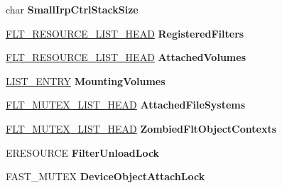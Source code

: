 \begin{DoxyCompactItemize}
\item 
\mbox{\label{struct___f_l_t_p___f_r_a_m_e_a39fcca68c78d7ef3ea8e784ebdffc093}} 
char {\bfseries Small\+Irp\+Ctrl\+Stack\+Size}
\item 
\mbox{\label{struct___f_l_t_p___f_r_a_m_e_a5c351985b1e09723dd4bb00469c73f6c}} 
\hyperlink{struct___f_l_t___r_e_s_o_u_r_c_e___l_i_s_t___h_e_a_d}{F\+L\+T\+\_\+\+R\+E\+S\+O\+U\+R\+C\+E\+\_\+\+L\+I\+S\+T\+\_\+\+H\+E\+AD} {\bfseries Registered\+Filters}
\item 
\mbox{\label{struct___f_l_t_p___f_r_a_m_e_a8d774b90231d3619939212f4afb43809}} 
\hyperlink{struct___f_l_t___r_e_s_o_u_r_c_e___l_i_s_t___h_e_a_d}{F\+L\+T\+\_\+\+R\+E\+S\+O\+U\+R\+C\+E\+\_\+\+L\+I\+S\+T\+\_\+\+H\+E\+AD} {\bfseries Attached\+Volumes}
\item 
\mbox{\label{struct___f_l_t_p___f_r_a_m_e_adeff92772c1d1d1850ebf94737a4cd03}} 
\hyperlink{struct___l_i_s_t___e_n_t_r_y}{L\+I\+S\+T\+\_\+\+E\+N\+T\+RY} {\bfseries Mounting\+Volumes}
\item 
\mbox{\label{struct___f_l_t_p___f_r_a_m_e_a2bd3a30abe6d4cf8bd69c6ebf8195bb7}} 
\hyperlink{struct___f_l_t___m_u_t_e_x___l_i_s_t___h_e_a_d}{F\+L\+T\+\_\+\+M\+U\+T\+E\+X\+\_\+\+L\+I\+S\+T\+\_\+\+H\+E\+AD} {\bfseries Attached\+File\+Systems}
\item 
\mbox{\label{struct___f_l_t_p___f_r_a_m_e_a4f3c74d458399feffbde98cdf64f1f2a}} 
\hyperlink{struct___f_l_t___m_u_t_e_x___l_i_s_t___h_e_a_d}{F\+L\+T\+\_\+\+M\+U\+T\+E\+X\+\_\+\+L\+I\+S\+T\+\_\+\+H\+E\+AD} {\bfseries Zombied\+Flt\+Object\+Contexts}
\item 
\mbox{\label{struct___f_l_t_p___f_r_a_m_e_a37f9679f960d74d9ed2a947a8ccb752d}} 
E\+R\+E\+S\+O\+U\+R\+CE {\bfseries Filter\+Unload\+Lock}
\item 
\mbox{\label{struct___f_l_t_p___f_r_a_m_e_a688e041e5daa34c88b789b9f50ccb23e}} 
F\+A\+S\+T\+\_\+\+M\+U\+T\+EX {\bfseries Device\+Object\+Attach\+Lock}
\item 

\end{DoxyCompactItemize}
